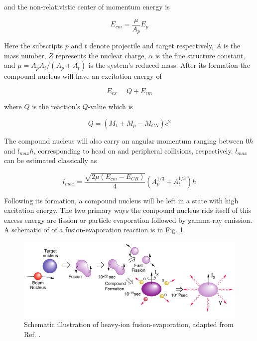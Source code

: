 and the non-relativistic center of momentum energy is

\begin{equation}
\label{eqn:chp3-cmf_en}
E_{cm} = \frac{\mu}{A_{p}}E_{p}
\end{equation}

Here the subscripts $p$ and $t$ denote projectile and target respectively, $A$ is the mass number, $Z$ represents the nuclear charge, $\alpha{}$ is the fine structure constant, and $\mu = A_{p}A_{t}/(A_{p}+A_{t})$ is the system's reduced mass. After its formation the compound nucleus will have an excitation energy of

\begin{equation}
\label{eqn:chp3-cn_ex}
E_{ex} = Q + E_{cm}
\end{equation}

where $Q$ is the reaction's $Q$-value which is

\begin{equation}
\label{eqn:chp3-cn_form_qvalue}
Q = (M_t+M_p-M_{CN})c^2
\end{equation}

The compound nucleus will also carry an angular momentum ranging between $0 \hbar$ and $l_{max} \hbar$, corresponding to head on and peripheral collisions, respectively. $l_{max}$ can be estimated classically as

\begin{equation}
\label{eqn:chp3-cn_lmax}
l_{max} = \frac{\sqrt{2\mu(E_{cm}-E_{CB})}}{4}(A^{1/3}_p + A^{1/3}_t)\hbar
\end{equation}

Following its formation, a compound nucleus will be left in a state with high excitation energy. The two primary ways the compound nucleus rids itself of this excess energy are fission\cite{fastFission} or particle evaporation followed by gamma-ray emission. A schematic of of a fusion-evaporation reaction is in Fig. \ref{fig:chp3-fus-evap-schem}.

\begin{figure}[h!]
	\centerline{\includegraphics[width=\textwidth]{./img/c3/fusion_evaporation.pdf}}
	\caption{Schematic illustration of heavy-ion fusion-evaporation, adapted from Ref. \cite{gsBooklet}.}
	\label{fig:chp3-fus-evap-schem}
\end{figure}

